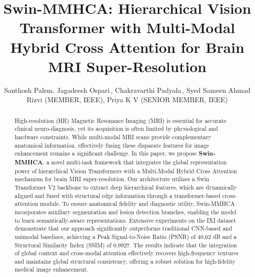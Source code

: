 \documentclass{IEEEoj}
\begin{document}

\title{Swin-MMHCA: Hierarchical Vision Transformer with Multi-Modal Hybrid Cross Attention for Brain MRI Super-Resolution}

\author{Santhosh Palem, Jagadeesh Ospari\,, Chakravarthi Padyala\,, Syed Sameen Ahmad Rizvi  (MEMBER, IEEE), Priya K V  (SENIOR MEMBER, IEEE)}

\begin{abstract}
High-resolution (HR) Magnetic Resonance Imaging (MRI) is essential for accurate clinical neuro-diagnosis, yet its acquisition is often limited by physiological and hardware constraints. While multi-modal MRI scans provide complementary anatomical information, effectively fusing these disparate features for image enhancement remains a significant challenge. In this paper, we propose \textbf{Swin-MMHCA}, a novel multi-task framework that integrates the global representation power of hierarchical Vision Transformers with a Multi-Modal Hybrid Cross Attention mechanism for brain MRI super-resolution. Our architecture utilizes a Swin Transformer V2 backbone to extract deep hierarchical features, which are dynamically aligned and fused with structural edge information through a transformer-based cross-attention module. To ensure anatomical fidelity and diagnostic utility, Swin-MMHCA incorporates auxiliary segmentation and lesion detection branches, enabling the model to learn semantically-aware representations. Extensive experiments on the IXI dataset demonstrate that our approach significantly outperforms traditional CNN-based and unimodal baselines, achieving a Peak Signal-to-Noise Ratio (PSNR) of 40.62 dB and a Structural Similarity Index (SSIM) of 0.9927. The results indicate that the integration of global context and cross-modal attention effectively recovers high-frequency textures and maintains global structural consistency, offering a robust solution for high-fidelity medical image enhancement.
\end{abstract}
\end{document}
